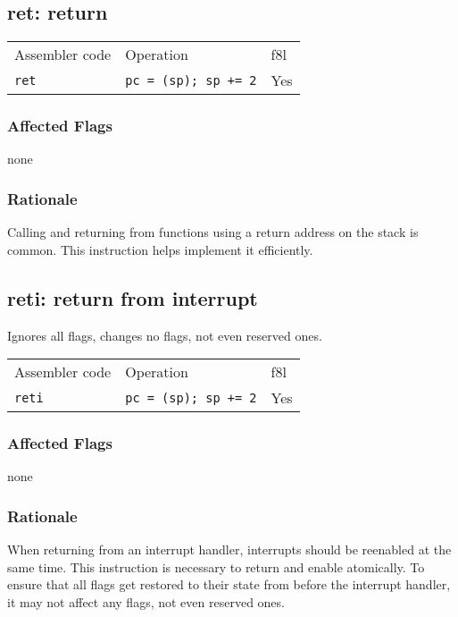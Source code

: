\documentclass{book}
\begin{document}
\subsection{ret: return}

\begin{tabular}{l l l}
Assembler code & Operation                   & f8l \\
\texttt{ret}   & \texttt{pc = (sp); sp += 2} & Yes \\
\end{tabular}

\subsubsection*{Affected Flags}

none

\subsubsection*{Rationale}

Calling and returning from functions using a return address on the stack is common. This instruction helps implement it efficiently.


\subsection{reti: return from interrupt}

Ignores all flags, changes no flags, not even reserved ones.

\begin{tabular}{l l l}
Assembler code  & Operation                   & f8l \\
\texttt{reti}   & \texttt{pc = (sp); sp += 2} & Yes \\
\end{tabular}

\subsubsection*{Affected Flags}

none

\subsubsection*{Rationale}

When returning from an interrupt handler, interrupts should be reenabled at the same time. This instruction is necessary to return and enable atomically. To ensure that all flags get restored to their state from before the interrupt handler, it may not affect any flags, not even reserved ones.
\end{document}

